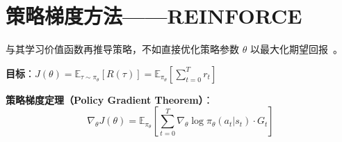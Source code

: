 \newpage
\section{策略梯度方法——REINFORCE}
\label{policy-gradient-methods-reinforce}

与其学习价值函数再推导策略，不如直接优化策略参数 $\theta$ 以最大化期望回报~\cite{williams1992simple}。

\textbf{目标}：$J(\theta) = \mathbb{E}_{\tau \sim \pi_\theta}[R(\tau)] = \mathbb{E}_{\pi_\theta}\left[\sum_{t=0}^T r_t\right]$

\textbf{策略梯度定理（Policy Gradient Theorem）}：
\begin{equation}
\boxed{\nabla_\theta J(\theta) = \mathbb{E}_{\pi_\theta}\left[\sum_{t=0}^T \nabla_\theta \log \pi_\theta(a_t|s_t) \cdot G_t\right]}
\end{equation}

